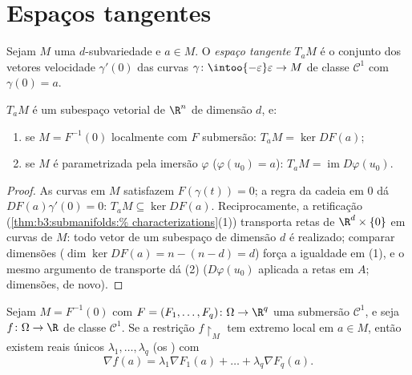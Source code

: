 \section{Espaços tangentes}

\begin{definition}\label{def:b3:submanifolds:tangent}
Sejam $M$ uma $d$-subvariedade e $a \in M$. O \emph{espaço
tangente} $T_aM$ é o conjunto dos vetores
velocidade $\gamma'(0)$ das curvas $\gamma \colon
\intoo{-\varepsilon}\varepsilon \to M$ de classe $\mathcal C^1$ com $\gamma(0) = a$.
\end{definition}

\begin{proposition}\label{prop:b3:submanifolds:tangent}
$T_aM$ é um subespaço vetorial de $\R^n$ de dimensão $d$, e:
\begin{enumerate}
  \item se $M = F^{-1}(0)$ localmente com $F$ submersão: $T_aM = \ker DF(a)$;
  \item se $M$ é parametrizada pela imersão $\varphi$ ($\varphi(u_0) = a$): $T_aM =
        \operatorname{im}D\varphi(u_0)$.
\end{enumerate}
\end{proposition}

\begin{proof}
As curvas em $M$ satisfazem $F(\gamma(t)) = 0$; a regra da cadeia em $0$ dá
$DF(a)\gamma'(0) = 0$: $T_aM \subseteq \ker DF(a)$. Reciprocamente, a retificação (\cref{thm:b3:submanifolds:%
characterizations}(1))
transporta retas de $\R^d\times\{0\}$ em curvas de $M$: todo vetor de um
subespaço de dimensão $d$ é realizado; comparar dimensões ($\dim\ker DF(a) = n - (n - d) = d$)
força a igualdade em (1), e o mesmo argumento de transporte dá (2)
($D\varphi(u_0)$ aplicada a retas em $A$; dimensões, de novo).
\end{proof}

\begin{theorem}
\label{thm:b3:submanifolds:lagrange}
Sejam $M = F^{-1}(0)$ com $F = (F_1, \dots, F_q) \colon \Omega
\to \R^q$ uma submersão $\mathcal C^1$, e seja $f \colon
\Omega \to \R$ de classe $\mathcal C^1$.
Se a restrição $f\restriction_M$ tem extremo local em $a \in M$, então existem reais
únicos $\lambda_1, \dots, \lambda_q$ (os \emph{})
com
\[
\nabla f(a) = \lambda_1\nabla F_1(a) + \dots +
\lambda_q\nabla F_q(a) .
\]
\end{theorem}

